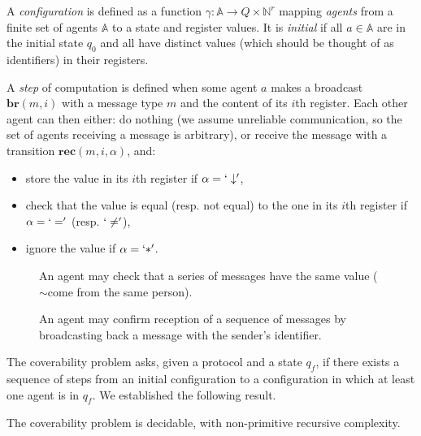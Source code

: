 \documentclass{article}
\newcommand{\nats}{\mathbb{N}}
\theoremstyle{definition}
\begin{document}
		
		A \emph{configuration} is defined as a function $\gamma : \mathbb{A} \to Q \times \nats^{r}$ mapping \emph{agents} from a finite set of agents $\mathbb{A}$ to a state and register values. It is \emph{initial} if all $a \in \mathbb{A}$ are in the initial state $q_0$ and all have distinct values (which should be thought of as identifiers) in their registers. 
			
		A \emph{step} of computation is defined when some agent $a$ makes a broadcast $\mathbf{br}(m,i)$ with a message type $m$ and the content of its $i$th register. Each other agent can then either:
		 do nothing (we assume unreliable communication, so the set of agents receiving a message is arbitrary), or  receive the message with a transition $\mathbf{rec}(m, i, \alpha)$, and:\vspace{-0.3cm}
				\begin{itemize}
					\item store the value in its $i$th register if $\alpha = `\downarrow'$,
					\item check that the value is equal (resp. not equal) to the one in its $i$th register if $\alpha = `='$ (resp. $`\neq'$),
					\item ignore the value if $\alpha=`*'$.
				\end{itemize}
	
	\begin{figure}[h]
		\centering
		\begin{minipage}{.47\textwidth}
		\centering
		
		\caption{An agent may check that a series of messages have the same value ($\sim$come from the same person).}
		\label{fig:pred}
		\end{minipage}%
		\hfill
		\begin{minipage}{.47\textwidth}
		\centering
		
		\label{fig:suc}
		\caption{An agent may confirm reception of a sequence of messages by broadcasting back a message with the sender's identifier.}
		\end{minipage}
	\end{figure}
	
	
	The coverability problem asks, given a protocol and a state $q_f$, if there exists a sequence of steps from an initial configuration to a configuration in which at least one agent is in $q_f$. We established the following result.
	
	\begin{theorem}
		The coverability problem is decidable, with non-primitive recursive complexity.
	\end{theorem}
\end{document}
